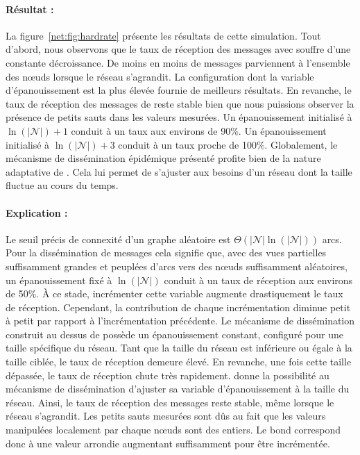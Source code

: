 \paragraph{Résultat :} La figure~\ref{net:fig:hardrate} présente les résultats
de cette simulation. Tout d'abord, nous observons que le taux de réception des
messages avec \CYCLON souffre d'une constante décroissance. De moins en moins de
messages parviennent à l'ensemble des nœuds lorsque le réseau s'agrandit. La
configuration dont la variable d'épanouissement est la plus élevée fournie de
meilleurs résultats. En revanche, le taux de réception des messages de \SPRAY
reste stable bien que nous puissions observer la présence de petits sauts dans
les valeurs mesurées. Un épanouissement initialisé à $\ln(|\mathcal{N}|)+1$
conduit à un taux aux environs de 90\%. Un épanouissement initialisé à
$\ln(|\mathcal{N}|)+3$ conduit à un taux proche de 100\%. Globalement, le
mécanisme de dissémination épidémique présenté profite bien de la nature
adaptative de \SPRAY. Cela lui permet de s'ajuster aux besoins d'un réseau dont
la taille fluctue au cours du temps.

\paragraph{Explication :} Le seuil précis de connexité d'un graphe aléatoire est
$\Theta(|\mathcal{N}|\ln(|\mathcal{N}|))$ arcs. Pour la dissémination de
messages cela signifie que, avec des vues partielles suffisamment grandes et
peuplées d'arcs vers des nœuds suffisamment aléatoires, un épanouissement fixé à
$\ln(|\mathcal{N}|)$ conduit à un taux de réception aux environs de 50\%. À ce
stade, incrémenter cette variable augmente drastiquement le taux de
réception. Cependant, la contribution de chaque incrémentation diminue petit à
petit par rapport à l'incrémentation précédente. Le mécanisme de dissémination
construit au dessus de \CYCLON possède un épanouissement constant, configuré
pour une taille spécifique du réseau. Tant que la taille du réseau est
inférieure ou égale à la taille ciblée, le taux de réception demeure élevé. En
revanche, une fois cette taille dépassée, le taux de réception chute très
rapidement. \SPRAY donne la possibilité au mécanisme de dissémination d'ajuster
sa variable d'épanouissement à la taille du réseau. Ainsi, le taux de réception
des messages reste stable, même lorsque le réseau s'agrandit. Les petits sauts
mesurées sont dûs au fait que les valeurs manipulées localement par chaque nœuds
sont des entiers. Le bond correspond donc à une valeur arrondie augmentant
suffisamment pour être incrémentée.

